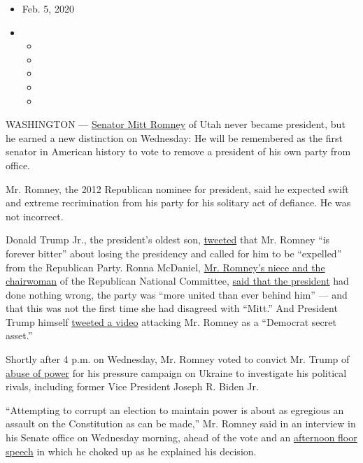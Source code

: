 \begin{itemize}
\item
  Feb. 5, 2020
\item
  \begin{itemize}
  \item
  \item
  \item
  \item
  \item
  \end{itemize}
\end{itemize}

WASHINGTON ---
\href{https://www.nytimes.com/2020/02/06/podcasts/the-daily/mitt-romney.html}{Senator
Mitt Romney} of Utah never became president, but he earned a new
distinction on Wednesday: He will be remembered as the first senator in
American history to vote to remove a president of his own party from
office.

Mr. Romney, the 2012 Republican nominee for president, said he expected
swift and extreme recrimination from his party for his solitary act of
defiance. He was not incorrect.

Donald Trump Jr., the president's oldest son,
\href{https://twitter.com/DonaldJTrumpJr/status/1225140190920019968}{tweeted}
that Mr. Romney ``is forever bitter'' about losing the presidency and
called for him to be ``expelled'' from the Republican Party. Ronna
McDaniel,
\href{https://www.nytimes.com/2018/01/13/us/politics/ronna-romney-mcdaniel.html}{Mr.
Romney's niece and the chairwoman} of the Republican National Committee,
\href{https://twitter.com/GOPChairwoman/status/1225140565131571200}{said
that the president} had done nothing wrong, the party was ``more united
than ever behind him'' --- and that this was not the first time she had
disagreed with ``Mitt.'' And President Trump himself
\href{https://twitter.com/realDonaldTrump/status/1225203837226700800}{tweeted
a video} attacking Mr. Romney as a ``Democrat secret asset.''

Shortly after 4 p.m. on Wednesday, Mr. Romney voted to convict Mr. Trump
of
\href{https://www.nytimes.com/interactive/2020/01/22/us/politics/impeachment-articles-arguments.html}{abuse
of power} for his pressure campaign on Ukraine to investigate his
political rivals, including former Vice President Joseph R. Biden Jr.

``Attempting to corrupt an election to maintain power is about as
egregious an assault on the Constitution as can be made,'' Mr. Romney
said in an interview in his Senate office on Wednesday morning, ahead of
the vote and an
\href{https://www.nytimes.com/2020/02/05/us/politics/mitt-romney-impeachment-speech-transcript.html}{afternoon
floor speech} in which he choked up as he explained his decision.

